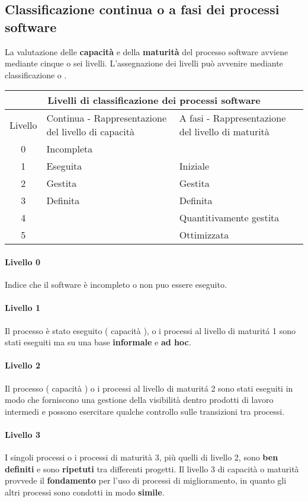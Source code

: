\subsection{Classificazione continua o a fasi dei processi software}
La valutazione delle \textbf{capacit\`a} e della \textbf{maturit\`a} del processo software avviene mediante cinque o sei livelli. L'assegnazione dei livelli pu\`o avvenire mediante classificazione  o . \newline
\begin{center}
\begin{tabular}{|c|p{5cm}|p{5cm}|}
\hline
\multicolumn{3}{|c|}{Livelli di classificazione dei processi software} \\
\hline
Livello & Continua - Rappresentazione del livello di capacit\`a & A fasi - Rappresentazione del livello di maturit\`a \\ \hline
0 & Incompleta & \\ \hline
1 & Eseguita & Iniziale \\ \hline
2 & Gestita & Gestita \\ \hline
3 & Definita & Definita \\ \hline
4 & & Quantitivamente gestita \\ \hline
5 & & Ottimizzata \\
\hline
\end{tabular}
\end{center}
\paragraph{Livello 0}
Indice che il software \`e incompleto o non puo essere eseguito.
\paragraph{Livello 1}
Il processo \`e stato eseguito ( capacit\`a ), o i processi al livello di maturit\'a 1 sono stati eseguiti ma su una base \textbf{informale} e \textbf{ad hoc}.
\paragraph{Livello 2}
Il processo ( capacit\`a ) o i processi al livello di maturit\'a 2 sono stati eseguiti in modo che forniscono una gestione della visibilit\`a dentro prodotti di lavoro intermedi e possono esercitare qualche controllo sulle transizioni tra processi. 
\paragraph{Livello 3}
I singoli processi o i processi di maturit\`a 3, pi\`u quelli di livello 2, sono \textbf{ben definiti} e sono \textbf{ripetuti} tra differenti progetti. \newline
Il livello 3 di capacit\`a o maturit\`a provvede il \textbf{fondamento} per l'uso di processi di miglioramento, in quanto gli altri processi sono condotti in modo \textbf{simile}. \newline
